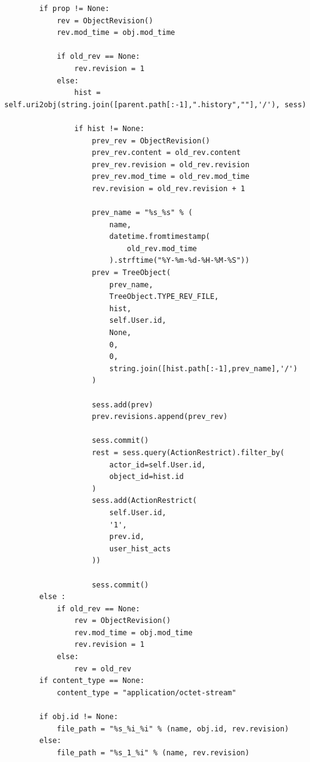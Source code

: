 \documentclass[utf8,usehyperref,12pt]{G7-32}
\begin{document}
\lstset{language=Python,caption=Сохранение файла,label=lst:put_file}
\begin{lstlisting}
		if prop != None:
            rev = ObjectRevision()
            rev.mod_time = obj.mod_time
        
            if old_rev == None:
                rev.revision = 1            
            else:
                hist = self.uri2obj(string.join([parent.path[:-1],".history",""],'/'), sess)                           
                
                if hist != None:                    
                    prev_rev = ObjectRevision()
                    prev_rev.content = old_rev.content
                    prev_rev.revision = old_rev.revision
                    prev_rev.mod_time = old_rev.mod_time
                    rev.revision = old_rev.revision + 1
                    
                    prev_name = "%s_%s" % (
                    	name, 
                    	datetime.fromtimestamp(
                    		old_rev.mod_time
                    	).strftime("%Y-%m-%d-%H-%M-%S"))    
                    prev = TreeObject(
                    	prev_name,
                    	TreeObject.TYPE_REV_FILE,
                    	hist,
                    	self.User.id,
                    	None,
                    	0,
                    	0,
                    	string.join([hist.path[:-1],prev_name],'/')
                    )
                   
                    sess.add(prev)
                    prev.revisions.append(prev_rev)                
                    
                    sess.commit() 
                    rest = sess.query(ActionRestrict).filter_by(
	                    actor_id=self.User.id, 
    	                object_id=hist.id 
    	            )       
                    sess.add(ActionRestrict(
                    	self.User.id, 
                    	'1', 
                    	prev.id, 
                    	user_hist_acts 
                    ))
                    
                    sess.commit()
        else :
            if old_rev == None:
                rev = ObjectRevision()
                rev.mod_time = obj.mod_time
                rev.revision = 1
            else:
                rev = old_rev           
        if content_type == None:
            content_type = "application/octet-stream"
        
        if obj.id != None:
            file_path = "%s_%i_%i" % (name, obj.id, rev.revision)
        else:
            file_path = "%s_1_%i" % (name, rev.revision)
        

\end{lstlisting}
\end{document}
